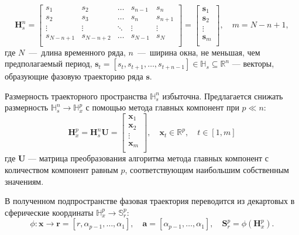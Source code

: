 \documentclass[article,14pt,subf,href,colorlinks=true
]{disser}
\begin{document}
\begin{equation*}
    \mathbf{H}_{s}^{n} = 
    \begin{bmatrix} 
    	s_{1} & s_{2} & \ldots &s_{n-1} &s_{n}\\
    	s_{2} & s_{3} & \ldots &s_{n} &s_{n+1}\\
    	\vdots& \vdots & \ddots & \vdots & \vdots\\
    	s_{N-n+1} & s_{N-n+2} &\ldots&s_{N-1} &s_{N}\\
    \end{bmatrix} = 
	\begin{bmatrix} 
      	\mathbf{s}_{1}\\
      	\mathbf{s}_{2}\\
      	\vdots\\
      	\mathbf{s}_{m}\\
   \end{bmatrix},
   \quad
   m = N-n+1,
\label{eq:hankel_matrix}
\end{equation*}
где $N$~---~длина временного ряда, $n$~---~ширина окна, не меньшая, чем предполагаемый период,  $\mathbf{s}_t=[s_{t},s_{t+1},\ldots,s_{t+n-1}] \in \mathbb{H}_{s} \subseteq \mathbb{R}^{n}$ --- векторы, образующие фазовую траекторию ряда $\mathbf{s}$.

Размерность траекторного пространства $\mathbb{H}_{s}^{n}$ избыточна.
Предлагается снижать размерность $\mathbb{H}_{s}^{n} \xrightarrow{} \mathbb{H}_{x}^{p}$ с помощью метода главных компонент при $p \ll n $:
\begin{equation}
\mathbf{H}_{x}^{p} = \mathbf{H}_{s}^{n}\mathbf{U} =
\begin{bmatrix} 
  	\mathbf{x}_{1}\\
  	\mathbf{x}_{2}\\
  	\vdots\\
  	\mathbf{x}_{m}\\
\end{bmatrix},
\quad
\mathbf{x}_{t} \in \mathbb{R}^{p},
\quad
t \in [1,m]
\label{eq:PCA}
\end{equation}
где $\mathbf{U}$ --- матрица преобразования алгоритма метода главных компонент с количеством компонент равным $p$, соответствующим наибольшим собственным значениям.

В полученном подпространстве фазовая траектория переводится из декартовых в сферические координаты $\mathbb{H}_{x}^{p} \xrightarrow{} \mathbb{S}_{r}^{p}$:
\[
    \phi: \mathbf{x} \xrightarrow{} \mathbf{r} = [r,\alpha_{p-1},\dots,\alpha_1],
    \quad
    \mathbf{a} = [\alpha_{p-1},\dots,\alpha_1],
    \quad
    \mathbf{S}_{r}^{p} = \phi(\mathbf{H}_{x}^{p}).
\]
\end{document}
